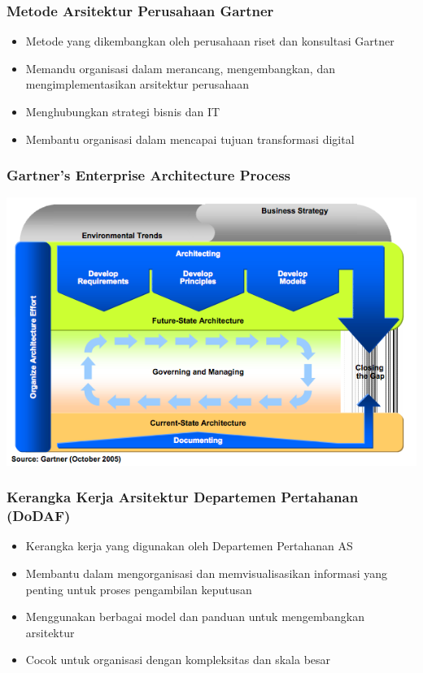 \documentclass{beamer}
\begin{document}
	\begin{frame}
		\frametitle{Metode Arsitektur Perusahaan Gartner}
		\begin{itemize}
			\item Metode yang dikembangkan oleh perusahaan riset dan konsultasi Gartner
			\item Memandu organisasi dalam merancang, mengembangkan, dan mengimplementasikan arsitektur perusahaan
			\item Menghubungkan strategi bisnis dan IT
			\item Membantu organisasi dalam mencapai tujuan transformasi digital
		\end{itemize}
	\end{frame}
	
	{
		\begin{frame}
			\frametitle{Gartner's Enterprise Architecture Process}
			\begin{center}
				\includegraphics[width=.95\textwidth]{../figures/gartner}
			\end{center}
		\end{frame}
	}

	\begin{frame}
		\frametitle{Kerangka Kerja Arsitektur Departemen Pertahanan (DoDAF)}
		\begin{itemize}
			\item Kerangka kerja yang digunakan oleh Departemen Pertahanan AS
			\item Membantu dalam mengorganisasi dan memvisualisasikan informasi yang penting untuk proses pengambilan keputusan
			\item Menggunakan berbagai model dan panduan untuk mengembangkan arsitektur
			\item Cocok untuk organisasi dengan kompleksitas dan skala besar
		\end{itemize}
	\end{frame}
	
\end{document}
